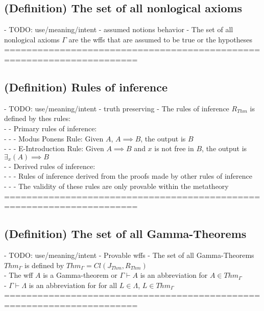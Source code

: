 \documentclass{article}
\begin{document}
\subsection{(Definition) The set of all nonlogical axioms}
	- TODO: use/meaning/intent - assumed notions behavior
	- The set of all nonlogical axioms $\Gamma$ are the wffs that are assumed to be true or the hypotheses
	======================================================================
\subsection{(Definition) Rules of inference}
	- TODO: use/meaning/intent - truth preserving
	- The rules of inference $R_{Thm}$ is defined by thes rules: \\
		- - Primary rules of inference: \\
			- - - Modus Ponens Rule: Given $A$, $A \implies B$, the output is $B$ \\
			- - - E-Introduction Rule: Given $A \implies B$ and $x$ is not free in $B$, the output is $\exists_x(A) \implies B$ \\
		- - Derived rules of inference: \\
			- - - Rules of inference derived from the proofs made by other rules of inference \\
			- - - The validity of these rules are only provable within the metatheory \\
			======================================================================
\subsection{(Definition) The set of all Gamma-Theorems}
	- TODO: use/meaning/intent - Provable wffs
	- The set of all Gamma-Theorems $Thm_\Gamma$ is defined by $Thm_\Gamma = Cl(J_{Thm}, R_{Thm})$ \\
	- The wff $A$ is a Gamma-theorem or $\Gamma \vdash A$ is an abbreviation for $A \in Thm_\Gamma$ \\
	- $\Gamma \vdash \Lambda $ is an abbreviation for for all $L \in \Lambda$, $L \in Thm_\Gamma$ \\
	======================================================================
\end{document}
